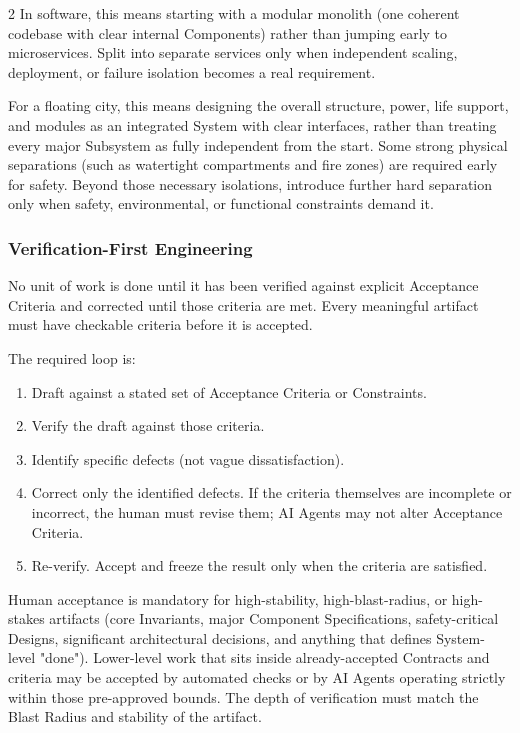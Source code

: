 \begin{multicols}{2}
In software, this means starting with a modular monolith (one coherent codebase with clear internal Components) rather than jumping early to microservices. Split into separate services only when independent scaling, deployment, or failure isolation becomes a real requirement.

For a floating city, this means designing the overall structure, power, life support, and modules as an integrated System with clear interfaces, rather than treating every major Subsystem as fully independent from the start. Some strong physical separations (such as watertight compartments and fire zones) are required early for safety. Beyond those necessary isolations, introduce further hard separation only when safety, environmental, or functional constraints demand it.

\hypertarget{gp-VFE}{}

\subsubsection*{Verification-First Engineering}

No unit of work is done until it has been verified against explicit Acceptance Criteria and corrected until those criteria are met. Every meaningful artifact must have checkable criteria before it is accepted.

The required loop is:

\begin{enumerate}\setlength{\itemsep}{0pt}\setlength{\parskip}{0pt}

\item Draft against a stated set of Acceptance Criteria or Constraints.

\item Verify the draft against those criteria.

\item Identify specific defects (not vague dissatisfaction).

\item Correct only the identified defects. If the criteria themselves are incomplete or incorrect, the human must revise them; AI Agents may not alter Acceptance Criteria.

\item Re-verify. Accept and freeze the result only when the criteria are satisfied.

\end{enumerate}

Human acceptance is mandatory for high-stability, high-blast-radius, or high-stakes artifacts (core Invariants, major Component Specifications, safety-critical Designs, significant architectural decisions, and anything that defines System-level "done"). Lower-level work that sits inside already-accepted Contracts and criteria may be accepted by automated checks or by AI Agents operating strictly within those pre-approved bounds. The depth of verification must match the Blast Radius and stability of the artifact.


\end{multicols}
